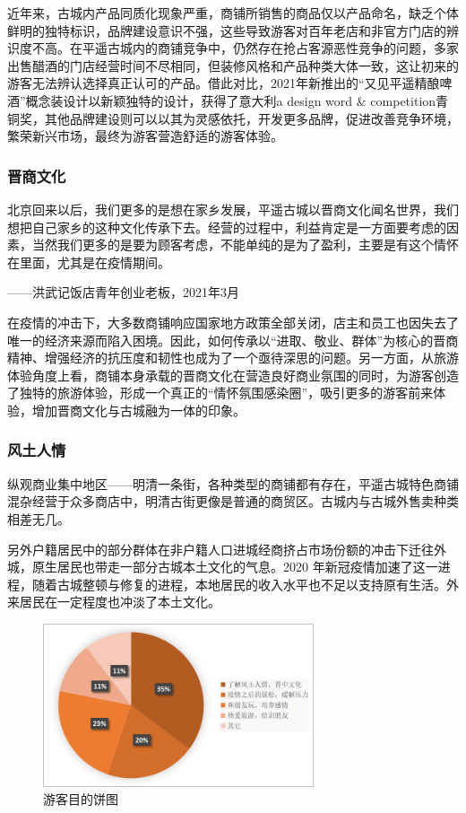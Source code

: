 \documentclass[UTF8]{ctexart}
\begin{document}
        近年来，古城内产品同质化现象严重，商铺所销售的商品仅以产品命名，缺乏个体鲜明的独特标识，品牌建设意识不强，这些导致游客对百年老店和非官方门店的辨识度不高。在平遥古城内的商铺竞争中，仍然存在抢占客源恶性竞争的问题，多家出售醋酒的门店经营时间不尽相同，但装修风格和产品种类大体一致，这让初来的游客无法辨认选择真正认可的产品。借此对比，2021年新推出的“又见平遥精酿啤酒”概念装设计以新颖独特的设计，获得了意大利a design word \& competition青铜奖，其他品牌建设则可以以其为灵感依托，开发更多品牌，促进改善竞争环境，繁荣新兴市场，最终为游客营造舒适的游客体验。
        \subsubsection{晋商文化}
        北京回来以后，我们更多的是想在家乡发展，平遥古城以晋商文化闻名世界，我们想把自己家乡的这种文化传承下去。经营的过程中，利益肯定是一方面要考虑的因素，当然我们更多的是要为顾客考虑，不能单纯的是为了盈利，主要是有这个情怀在里面，尤其是在疫情期间。
        
        \begin{flushright}
            ——洪武记饭店青年创业老板，2021年3月
        \end{flushright}

        在疫情的冲击下，大多数商铺响应国家地方政策全部关闭，店主和员工也因失去了唯一的经济来源而陷入困境。因此，如何传承以“进取、敬业、群体”为核心的晋商精神、增强经济的抗压度和韧性也成为了一个亟待深思的问题。另一方面，从旅游体验角度上看，商铺本身承载的晋商文化在营造良好商业氛围的同时，为游客创造了独特的旅游体验，形成一个真正的“情怀氛围感染圈”，吸引更多的游客前来体验，增加晋商文化与古城融为一体的印象。
        \subsubsection{风土人情}
        纵观商业集中地区——明清一条街，各种类型的商铺都有存在，平遥古城特色商铺混杂经营于众多商店中，明清古街更像是普通的商贸区。古城内与古城外售卖种类相差无几。
    
        另外户籍居民中的部分群体在非户籍人口进城经商挤占市场份额的冲击下迁往外城，原生居民也带走一部分古城本土文化的气息。2020 年新冠疫情加速了这一进程，随着古城整顿与修复的进程，本地居民的收入水平也不足以支持原有生活。外来居民在一定程度也冲淡了本土文化。
        \begin{figure}[H]
            \centering
            \includegraphics[width=8cm]{游客目的.png}
            \caption{游客目的饼图}
            \label{fig:my_label}
        \end{figure}
\end{document}
